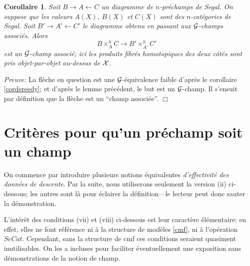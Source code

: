 \documentclass[12pt]{article}
\newcommand{\numero}[1]{\newpage\section{#1}}
\newcommand{\eop}{\hfill $\Box$\vspace{.1in}}
\newtheorem{corollaire}[lemma]{Corollaire}
\newcommand{\Gg}{{\cal G}}
\newcommand{\Xx}{{\cal X}}
\begin{document}
\begin{corollaire}
\label{rezkQ}
Soit $B\rightarrow A \leftarrow C$ un diagramme de $n$-pr\'echamps de Segal.
On suppose que
les valeurs $A(X)$, $B(X)$ et $C(X)$ sont des $n$-cat\'egories de Segal.
Soit $B'\rightarrow A'\leftarrow C'$ le diagramme obtenu en passant
aux $\Gg$-champs associ\'es. Alors
$$
B\times ^h_AC\rightarrow B'\times ^h_{A'}C'
$$
est un $\Gg$-champ associ\'e; ici les produits fibr\'es homotopiques des deux
c\^ot\'es sont pris objet-par-objet au-dessus de $\Xx$.
\end{corollaire}
{\em Preuve:}
La fl\`eche en question est une $\Gg$-\'equivalence faible d'apr\`es le
corollaire
\ref{cordereedy}; et d'apr\`es le lemme pr\'ec\'edent,
le but est un $\Gg$-champ. Il
s'ensuit par d\'efinition que la fl\`eche est un ``champ associ\'ee''.
\eop




\numero{Crit\`eres pour qu'un pr\'echamp soit un champ}
\label{caracterisationpage}

On commence par introduire plusieurs notions
\'equivalentes {\em d'effectivit\'e des donn\'ees de
descente}.
Par la suite, nous utiliserons seulement la version (ii)
ci-dessous; les autres
sont l\`a pour \'eclairer la d\'efinition---le
lecteur peut donc sauter la d\'emonstration.

L'int\'er\^et des conditions (vii) et (viii) ci-dessous est leur caract\`ere
\'el\'ementaire: en effet, elles ne font r\'ef\'erence
ni \`a la structure de mod\`eles \ref{cmf}, ni
\`a l'op\'eration $SeCat$. Cependant, sans la structure de cmf ces conditions
seraient quasiment inutilisables. On les a incluses pour
faciliter \'eventuellement une exposition sans
d\'emonstrations de la notion de champ.
\end{document}
